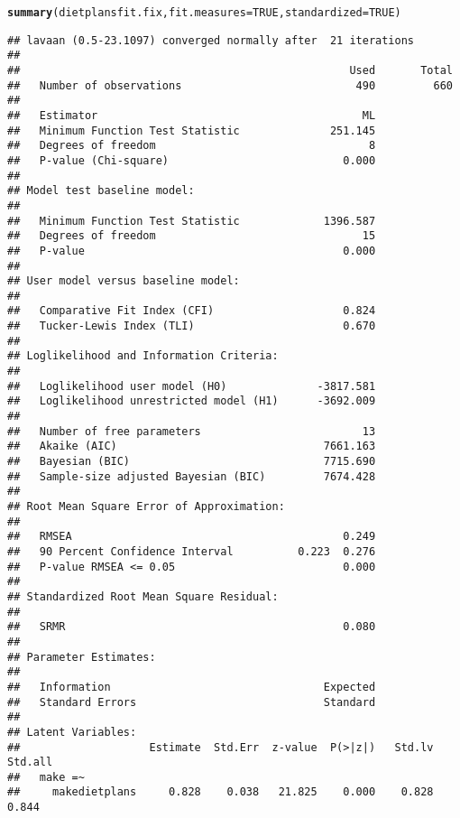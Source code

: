 \documentclass{article}\usepackage[]{graphicx}\usepackage[]{color}
\makeatletter
\newcommand{\hlnum}[1]{\textcolor[rgb]{0.686,0.059,0.569}{#1}}%
\newcommand{\hlstd}[1]{\textcolor[rgb]{0.345,0.345,0.345}{#1}}%
\newcommand{\hlkwc}[1]{\textcolor[rgb]{0.333,0.667,0.333}{#1}}%
\newcommand{\hlkwd}[1]{\textcolor[rgb]{0.737,0.353,0.396}{\textbf{#1}}}%
\newenvironment{kframe}{%
 \def\at@end@of@kframe{}%
 \ifinner\ifhmode%
  \def\at@end@of@kframe{\end{minipage}}%
  \begin{minipage}{\columnwidth}%
 \fi\fi%
 \def\FrameCommand##1{\hskip\@totalleftmargin \hskip-\fboxsep
 \colorbox{shadecolor}{##1}\hskip-\fboxsep
     \hskip-\linewidth \hskip-\@totalleftmargin \hskip\columnwidth}%
 \MakeFramed {\advance\hsize-\width
   \@totalleftmargin\z@ \linewidth\hsize
   \@setminipage}}%
 {\par\unskip\endMakeFramed%
 \at@end@of@kframe}
\newenvironment{knitrout}{}{} %
\makeatother
\begin{document}
\begin{knitrout}
\begin{kframe}
{\ttfamily\noindent{}}\begin{alltt}
\hlkwd{summary}\hlstd{(dietplansfit.fix,} \hlkwc{fit.measures} \hlstd{=} \hlnum{TRUE}\hlstd{,} \hlkwc{standardized} \hlstd{=} \hlnum{TRUE}\hlstd{)}
\end{alltt}
\begin{verbatim}
## lavaan (0.5-23.1097) converged normally after  21 iterations
## 
##                                                   Used       Total
##   Number of observations                           490         660
## 
##   Estimator                                         ML
##   Minimum Function Test Statistic              251.145
##   Degrees of freedom                                 8
##   P-value (Chi-square)                           0.000
## 
## Model test baseline model:
## 
##   Minimum Function Test Statistic             1396.587
##   Degrees of freedom                                15
##   P-value                                        0.000
## 
## User model versus baseline model:
## 
##   Comparative Fit Index (CFI)                    0.824
##   Tucker-Lewis Index (TLI)                       0.670
## 
## Loglikelihood and Information Criteria:
## 
##   Loglikelihood user model (H0)              -3817.581
##   Loglikelihood unrestricted model (H1)      -3692.009
## 
##   Number of free parameters                         13
##   Akaike (AIC)                                7661.163
##   Bayesian (BIC)                              7715.690
##   Sample-size adjusted Bayesian (BIC)         7674.428
## 
## Root Mean Square Error of Approximation:
## 
##   RMSEA                                          0.249
##   90 Percent Confidence Interval          0.223  0.276
##   P-value RMSEA <= 0.05                          0.000
## 
## Standardized Root Mean Square Residual:
## 
##   SRMR                                           0.080
## 
## Parameter Estimates:
## 
##   Information                                 Expected
##   Standard Errors                             Standard
## 
## Latent Variables:
##                    Estimate  Std.Err  z-value  P(>|z|)   Std.lv  Std.all
##   make =~                                                               
##     makedietplans     0.828    0.038   21.825    0.000    0.828    0.844

\end{verbatim}
\end{kframe}
\end{knitrout}
\end{document}
